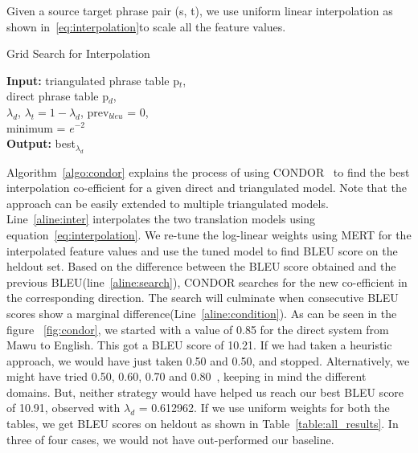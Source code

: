         Given a source target phrase pair (s, t), we use uniform linear interpolation as shown in~\eqref{eq:interpolation}to scale all the feature values. 
         \begin{algorithm}
                \small
                \caption{Grid Search for Interpolation}
                \label{algo:condor}
                \textbf{Input:} triangulated phrase table p$_{t}$, \\ direct phrase table p$_{d}$, \\
                $\lambda_{d}$, $\lambda_{t} = 1 - \lambda_{d}$, prev$_{bleu}$ = 0, \\
                minimum = $e ^{-2}$ \\
                \textbf{Output:} best$_{\lambda_{d}}$


                \begin{algorithmic}[l]
                         \label{aline:condition}
                         \label{aline:inter}
                         \label{aline:search}
                        \ENDWHILE
                       \end{algorithmic}
        \end{algorithm}

       Algorithm~\ref{algo:condor} explains the process of using CONDOR~\cite{condor-practice} to find the best interpolation co-efficient for a given direct and triangulated model. Note that the approach can be easily extended to multiple triangulated models. Line~\ref{aline:inter} interpolates the two translation models using equation~\eqref{eq:interpolation}. We re-tune the log-linear weights using MERT for the interpolated feature values and use the tuned model to find BLEU score on the heldout set. Based on the difference between the BLEU score obtained and the previous BLEU(line~\ref{aline:search}), CONDOR searches for the new co-efficient in the corresponding direction. The search will culminate when consecutive BLEU scores show a marginal difference(Line~\ref{aline:condition}). As can be seen in the figure ~\ref{fig:condor}, we started with a value of 0.85 for the direct system from Mawu to English. This got a BLEU score of 10.21. If we had taken a heuristic approach, we would have just taken 0.50 and 0.50, and stopped. Alternatively, we might have tried 0.50, 0.60, 0.70 and 0.80~\cite{Nakov:12}, keeping in mind the different domains. But, neither strategy would have helped us reach our best BLEU score of 10.91, observed with $\lambda_{d}$ = 0.612962. If we use uniform weights for both the tables, we get BLEU scores on heldout as shown in Table~\ref{table:all_results}. In three of four cases, we would not have out-performed our baseline.



